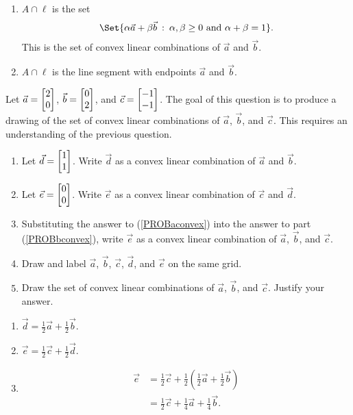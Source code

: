 \begin{exercises}
\begin{problist}
\begin{solution}
\begin{enumerate}
				\item $A \cap \ell$ is the set
				\[
					\Set{\alpha \vec a+\beta \vec b\given \alpha,\beta \geq 0\text{ and }
					\alpha+\beta = 1}.
				\]
				This is the set of convex linear
				combinations of $\vec a$ and $\vec b$. 
				\item $A
				\cap \ell$ is the line segment with endpoints $\vec a$ and $\vec b$.
			\end{enumerate}
		\end{solution}

	\prob
		Let $\vec a=\mat{2 \\0}$, $\vec b=\mat{0 \\ 2}$, and $\vec c=\mat{-1 \\ -1}$. 
		The goal of this question is to produce a drawing of the set of 
		convex linear combinations of $\vec a$, $\vec b$, and $\vec c$. This requires an understanding of the previous question.
		\begin{enumerate}
		\item \label{PROBaconvex} Let $\vec d=\mat{1 \\ 1}$. Write $\vec d$ as a convex
			linear combination of $\vec a$ and $\vec b$.
		\item \label{PROBbconvex} Let $\vec e=\mat{0 \\ 0}$. Write $\vec e$ as a convex 
			linear combination of $\vec c$ and $\vec d$.
		\item Substituting the answer to (\ref{PROBaconvex}) into the answer to part
			(\ref{PROBbconvex}), write $\vec e$ as a convex linear combination of $\vec a$, $\vec b$, and $\vec c$.
		\item Draw and label $\vec a$, $\vec b$, $\vec c$, $\vec d$, and
			$\vec e$ on the same grid.
		\item Draw the set of convex linear combinations of $\vec a$, $\vec b$, 
			and $\vec c$. Justify your answer.
		\end{enumerate}
	\begin{solution}
		\begin{enumerate}
			\item
			$
				\vec d = \tfrac{1}{2}\vec a + \tfrac{1}{2}\vec b.
			$
			\item
			$
				\vec e= \tfrac{1}{2}\vec c+\tfrac{1}{2}\vec d.
			$
			\item
			\begin{align*}
				\vec e & = \tfrac{1}{2}\vec c+\tfrac{1}{2}(\tfrac{1}{2}\vec a + \tfrac{1}{2}\vec b)\\
				       & = \tfrac{1}{2}\vec c+\tfrac{1}{4}\vec a + \tfrac{1}{4}\vec b.

\end{align*}
\end{enumerate}
\end{solution}
\end{problist}
\end{exercises}

